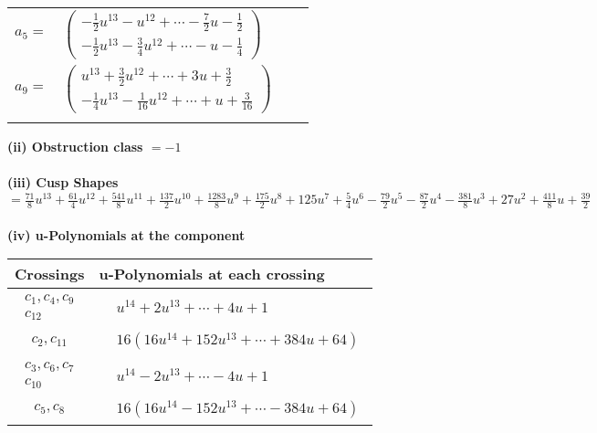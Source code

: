 \documentclass[1p]{elsarticle_modified}
\theoremstyle{definition}
\begin{document}
\begin{tabular}{m{7pt} m{180pt} m{7pt} m{180pt} }
\flushright $a_{5}=$&$\begin{pmatrix}-\frac{1}{2} u^{13}- u^{12}+\cdots-\frac{7}{2} u-\frac{1}{2}\\-\frac{1}{2} u^{13}-\frac{3}{4} u^{12}+\cdots- u-\frac{1}{4}\end{pmatrix}$ \\
\flushright $a_{9}=$&$\begin{pmatrix}u^{13}+\frac{3}{2} u^{12}+\cdots+3 u+\frac{3}{2}\\-\frac{1}{4} u^{13}-\frac{1}{16} u^{12}+\cdots+u+\frac{3}{16}\end{pmatrix}$\\&\end{tabular}
\flushleft \textbf{(ii) Obstruction class $= -1$}\\~\\
\flushleft \textbf{(iii) Cusp Shapes $= \frac{71}{8} u^{13}+\frac{61}{4} u^{12}+\frac{541}{8} u^{11}+\frac{137}{2} u^{10}+\frac{1283}{8} u^9+\frac{175}{2} u^8+125 u^7+\frac{5}{4} u^6-\frac{79}{2} u^5-\frac{87}{2} u^4-\frac{381}{8} u^3+27 u^2+\frac{411}{8} u+\frac{39}{2}$}\\~\\
\newpage\renewcommand{\arraystretch}{1}
\flushleft \textbf{(iv) u-Polynomials at the component}\newline \\
\begin{tabular}{m{50pt}|m{274pt}}
Crossings & \hspace{64pt}u-Polynomials at each crossing \\
\hline $$\begin{aligned}c_{1},c_{4},c_{9}\\c_{12}\end{aligned}$$&$\begin{aligned}
&u^{14}+2 u^{13}+\cdots+4 u+1
\end{aligned}$\\
\hline $$\begin{aligned}c_{2},c_{11}\end{aligned}$$&$\begin{aligned}
&16(16 u^{14}+152 u^{13}+\cdots+384 u+64)
\end{aligned}$\\
\hline $$\begin{aligned}c_{3},c_{6},c_{7}\\c_{10}\end{aligned}$$&$\begin{aligned}
&u^{14}-2 u^{13}+\cdots-4 u+1
\end{aligned}$\\
\hline $$\begin{aligned}c_{5},c_{8}\end{aligned}$$&$\begin{aligned}
&16(16 u^{14}-152 u^{13}+\cdots-384 u+64)
\end{aligned}$\\
\hline
\end{tabular}\\~\\
\end{document}
